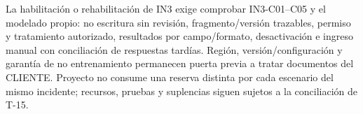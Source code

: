 La habilitación o rehabilitación de IN3 exige comprobar IN3-C01--C05 y el modelado propio: no escritura sin revisión, fragmento/versión trazables, permiso y tratamiento autorizado, resultados por campo/formato, desactivación e ingreso manual con conciliación de respuestas tardías. Región, versión/configuración y garantía de no entrenamiento permanecen puerta previa a tratar documentos del CLIENTE. Proyecto no consume una reserva distinta por cada escenario del mismo incidente; recursos, pruebas y suplencias siguen sujetos a la conciliación de T-15.
